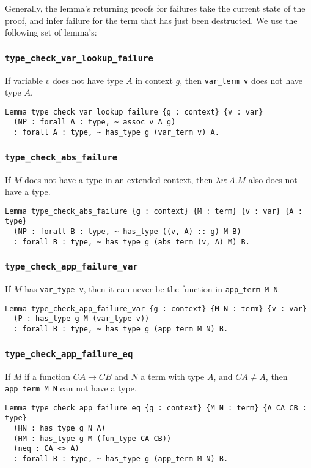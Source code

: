 \documentclass[a4paper, 10pt]{amsart}
\begin{document}
	Generally, the lemma's returning proofs for failures take the current state of the proof, and infer failure for the term that has just been destructed.
	We use the following set of lemma's:

		\subsubsection{\lstinline{type_check_var_lookup_failure}}
		
		If variable $v$ does not have type $A$ in context $g$, then \lstinline{var_term v} does not have type $A$.
\begin{lstlisting}
Lemma type_check_var_lookup_failure {g : context} {v : var}
  (NP : forall A : type, ~ assoc v A g)
  : forall A : type, ~ has_type g (var_term v) A.
\end{lstlisting}

		\subsubsection{\lstinline{type_check_abs_failure}}
		
		If $M$ does not have a type in an extended context, then $\lambda v:A.M$ also does not have a type.
\begin{lstlisting}
Lemma type_check_abs_failure {g : context} {M : term} {v : var} {A : type}
  (NP : forall B : type, ~ has_type ((v, A) :: g) M B)
  : forall B : type, ~ has_type g (abs_term (v, A) M) B.
\end{lstlisting}

		\subsubsection{\lstinline{type_check_app_failure_var}}
		
		If $M$ has \lstinline{var_type v}, then it can never be the function in \lstinline{app_term M N}.
\begin{lstlisting}
Lemma type_check_app_failure_var {g : context} {M N : term} {v : var}
  (P : has_type g M (var_type v))
  : forall B : type, ~ has_type g (app_term M N) B.
\end{lstlisting}

	\subsubsection{\lstinline{type_check_app_failure_eq}}

	If $M$ if a function $CA \rightarrow CB$ and $N$ a term with type $A$, and $CA \neq A$, then \lstinline{app_term M N} can not have a type.
\begin{lstlisting}
Lemma type_check_app_failure_eq {g : context} {M N : term} {A CA CB : type}
  (HN : has_type g N A)
  (HM : has_type g M (fun_type CA CB))
  (neq : CA <> A)
  : forall B : type, ~ has_type g (app_term M N) B.
\end{lstlisting}
\end{document}
